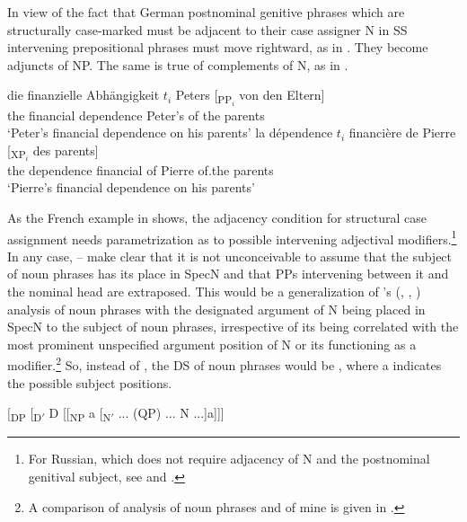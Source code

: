 \documentclass[output=paper,colorlinks,citecolor=brown]{langscibook}
\begin{document}
\noindent In view of the fact that German postnominal genitive phrases which are structurally case-marked must be adjacent to their case assigner N in SS intervening prepositional phrases must move rightward, as in . They become adjuncts of NP. The same is true of complements of N, as in .

\ea \label{ex:zi91:73}
    \ea \label{ex:zi91:73a} 
     \gll die finanzielle Abhängigkeit $t_{i}$ Peters [\textsubscript{PP$_i$} von den Eltern]\\
    the financial dependence {} Peter's {} of the parents\\
    \glt ‘Peter's financial dependence on his parents’
    \ex \label{ex:zi91:73b} 
    \gll la dépendence $t_{i}$ financière de Pierre [\textsubscript{XP$_i$} des parents]\\
    the dependence {} financial of Pierre {} of.the parents\\
    \glt ‘Pierre's financial dependence on his parents’
    \z
\z

\noindent As the French example in  shows, the adjacency condition for structural case assignment needs parametrization as to possible intervening adjectival modifiers.\footnote{For Russian, which does not require adjacency of N and the postnominal genitival subject, see \citet{Huste89Zur-Syntax, Huste89Zur-Topologie} and \citealt{Bischof91Sachverhaltsbezeichnungen-des}.} In any case, -- make clear that it is not unconceivable to assume that the subject of noun phrases has its place in SpecN and that PPs intervening between it and the nominal head are extraposed. This would be a generalization of \citeauthor{Bhatt89Parallels-in}'s (\citeyear{Bhatt89Parallels-in}, \citeyear{Bhatt90Die-syntaktische}, \citeyear{Bhatt90Kasuszuweisung-in}) analysis of noun phrases with the designated argument of N being placed in SpecN to the subject of noun phrases, irrespective of its being correlated with the most prominent unspecified argument position of N or its functioning as a modifier.\footnote{A comparison of  analysis of noun phrases and of mine is given in \citet{Zimmermann91Die-Syntax-Substantivgruppe}.} So, instead of , the DS of noun phrases would be , where a indicates the possible subject positions.

\ea \label{ex:zi91:74} $[$\textsubscript{DP} [\textsubscript{D$'$} D [[\textsubscript{NP} a [\textsubscript{N$'$} ... (QP) ... N ...]\;a]]]
\z
\end{document}
